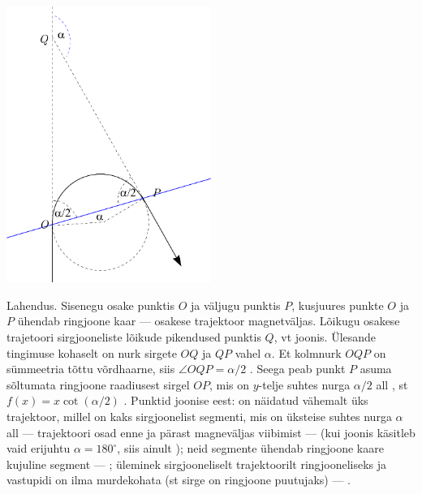 \solu
\vspace{-10pt}
  \begin{center}
    \includegraphics[width=0.5\textwidth]{2020-v2g-09-yl.pdf}
  \end{center}
  \vspace{-10pt}
Lahendus. Sisenegu osake punktis $O$ ja väljugu punktis $P$, kusjuures punkte $O$ ja $P$ ühendab ringjoone kaar --- osakese trajektoor magnetväljas. Lõikugu osakese trajetoori sirgjooneliste lõikude pikendused punktis $Q$, vt joonis. Ülesande tingimuse kohaselt on nurk sirgete $OQ$ ja $QP$ vahel $\alpha$. Et kolmnurk $OQP$ on sümmeetria tõttu võrdhaarne, siis $\angle OQP=\alpha/2$  . Seega peab punkt $P$ asuma sõltumata ringjoone raadiusest sirgel $OP$, mis on $y$-telje suhtes nurga $\alpha/2$ all  , st $f(x)=x\cot(\alpha/2)$  . Punktid joonise eest: on näidatud vähemalt üks trajektoor, millel on kaks sirgjoonelist segmenti, mis on üksteise suhtes nurga $\alpha$ all --- trajektoori osad enne ja pärast magneväljas viibimist ---  (kui joonis käsitleb vaid erijuhtu $\alpha=180^\circ$, siis ainult ); neid segmente ühendab ringjoone kaare kujuline segment --- ; üleminek sirgjooneliselt trajektoorilt ringjooneliseks ja vastupidi on ilma murdekohata (st sirge on ringjoone puutujaks) --- .

\vspace{10pt}
\probend